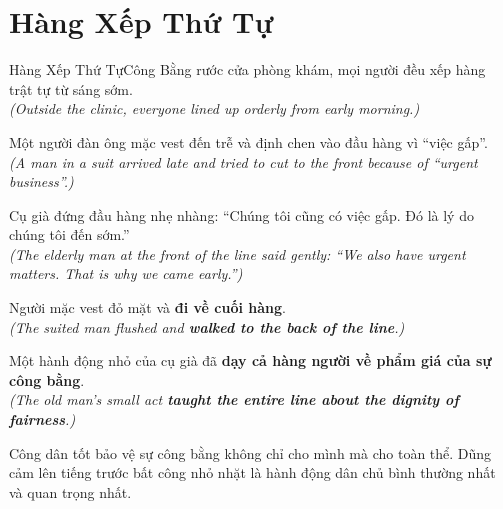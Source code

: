 \section{Hàng Xếp Thứ Tự}
\begin{truyen}{Hàng Xếp Thứ Tự}{Công Bằng}
rước cửa phòng khám, mọi người đều xếp hàng trật tự từ sáng sớm.\\
\textit{(Outside the clinic, everyone lined up orderly from early morning.)}

Một người đàn ông mặc vest đến trễ và định chen vào đầu hàng vì ``việc gấp''.\\
\textit{(A man in a suit arrived late and tried to cut to the front because of ``urgent business''.)}

Cụ già đứng đầu hàng nhẹ nhàng: ``Chúng tôi cũng có việc gấp. Đó là lý do chúng tôi đến sớm.''\\
\textit{(The elderly man at the front of the line said gently: ``We also have urgent matters. That is why we came early.'')}

Người mặc vest đỏ mặt và \textbf{đi về cuối hàng}.\\
\textit{(The suited man flushed and \textbf{walked to the back of the line}.)}

Một hành động nhỏ của cụ già đã \textbf{dạy cả hàng người về phẩm giá của sự công bằng}.\\
\textit{(The old man's small act \textbf{taught the entire line about the dignity of fairness}.)}
\end{truyen}
\begin{baihoc}
  Công dân tốt bảo vệ sự công bằng không chỉ cho mình mà cho toàn thể. Dũng cảm lên tiếng trước bất công nhỏ nhặt là hành động dân chủ bình thường nhất và quan trọng nhất.
\end{baihoc}

